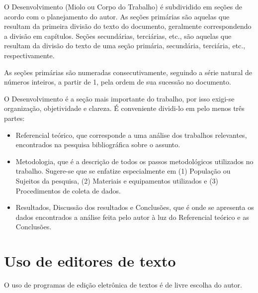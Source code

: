 O Desenvolvimento (Miolo ou Corpo do Trabalho) é subdividido em seções de
acordo com o planejamento do autor. As seções primárias são aquelas que
resultam da primeira divisão do texto do documento, geralmente
correspondendo a divisão em capítulos. Seções secundárias, terciárias,
etc., são aquelas que resultam da divisão do texto de uma seção primária,
secundária, terciária, etc., respectivamente.

As seções primárias são numeradas consecutivamente, seguindo a série
natural de números inteiros, a partir de 1, pela ordem de sua sucessão no
documento.

O Desenvolvimento é a seção mais importante do trabalho, por isso exigi-se
organização, objetividade e clareza. É conveniente dividi-lo em pelo menos
três partes:

\begin{itemize}

	\item Referencial teórico, que corresponde a uma análise dos trabalhos
	relevantes, encontrados na pesquisa bibliográfica sobre o assunto.
	\item Metodologia, que é a descrição de todos os passos metodológicos
	utilizados no trabalho. Sugere-se que se enfatize especialmente em (1)
	População ou Sujeitos da pesquisa, (2) Materiais e equipamentos
	utilizados e (3) Procedimentos de coleta de dados.
	\item Resultados, Discussão dos resultados e Conclusões, que é onde se
	apresenta os dados encontrados a análise feita pelo autor à luz do
	Referencial teórico e as Conclusões.

\end{itemize}

\section{Uso de editores de texto}

O uso de programas de edição eletrônica de textos é de livre escolha do autor.

